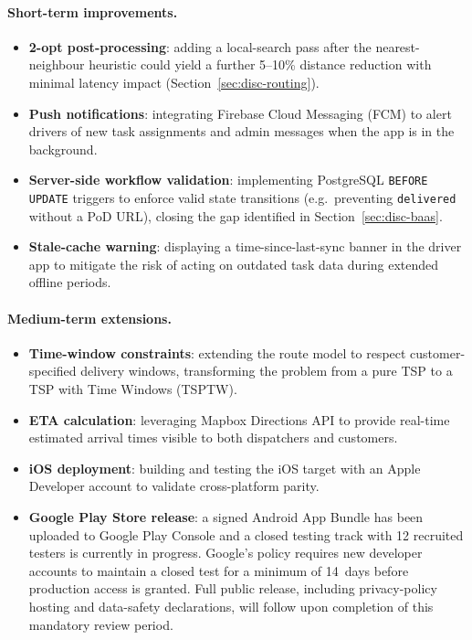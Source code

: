 \paragraph{Short-term improvements.}
\begin{itemize}
  \item \textbf{2-opt post-processing}: adding a local-search pass
        after the nearest-neighbour heuristic could yield a further
        5--10\% distance reduction with minimal latency impact
        (Section~\ref{sec:disc-routing}).
  \item \textbf{Push notifications}: integrating Firebase Cloud
        Messaging (FCM) to alert drivers of new task assignments and
        admin messages when the app is in the background.
  \item \textbf{Server-side workflow validation}: implementing
        PostgreSQL \texttt{BEFORE UPDATE} triggers to enforce valid
        state transitions (e.g.\ preventing \texttt{delivered} without
        a PoD URL), closing the gap identified in
        Section~\ref{sec:disc-baas}.
  \item \textbf{Stale-cache warning}: displaying a time-since-last-sync
        banner in the driver app to mitigate the risk of acting on
        outdated task data during extended offline periods.
\end{itemize}

\paragraph{Medium-term extensions.}
\begin{itemize}
  \item \textbf{Time-window constraints}: extending the route model to
        respect customer-specified delivery windows, transforming the
        problem from a pure TSP to a TSP with Time Windows (TSPTW).
  \item \textbf{ETA calculation}: leveraging Mapbox Directions API to
        provide real-time estimated arrival times visible to both
        dispatchers and customers.
  \item \textbf{iOS deployment}: building and testing the iOS target
        with an Apple Developer account to validate cross-platform
        parity.
  \item \textbf{Google Play Store release}: a signed Android App Bundle
        has been uploaded to Google Play Console and a closed testing
        track with 12 recruited testers is currently in progress.
        Google's policy requires new developer accounts to maintain a
        closed test for a minimum of 14~days before production access
        is granted.  Full public release, including privacy-policy
        hosting and data-safety declarations, will follow upon
        completion of this mandatory review period.
\end{itemize}

